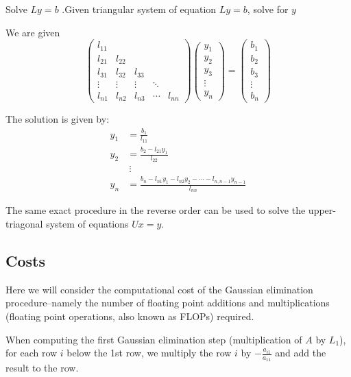 \documentclass[12pt,letterpaper]{article}
\begin{document}
\begin{algo}{Solve $Ly = b$}
.Given triangular system of equation $Ly = b$, solve for $y$

We are given
\begin{equation}
\begin{pmatrix}
	l_{11} & \\
	l_{21} & l_{22} \\
	l_{31} & l_{32} & l_{33} \\
	\vdots & \vdots & \vdots & \ddots \\
	l_{n1} & l_{n2} & l_{n3} & \cdots & l_{nn}
\end{pmatrix}
\begin{pmatrix}
	y_1 \\ y_2 \\ y_3 \\ \vdots \\ y_n
\end{pmatrix} =
\begin{pmatrix}
	b_1 \\ b_2 \\ b_3 \\ \vdots \\ b_n
\end{pmatrix}
\end{equation}

The solution is given by:
\begin{align}
	y_1 &= \frac{b_1}{l_{11}} \\
	y_2 &= \frac{b_2 - l_{21}y_1}{l_{22}}\\
	&\ \vdots \\
	y_n &= \frac{b_n - l_{n1}y_1 - l_{n2}y_2 - \cdots - l_{n,n-1}y_{n-1}}{l_{nn}}
\end{align}

The same exact procedure in the reverse order can be used to solve the upper-triagonal system of equations $Ux = y$.
\label{alg:triagonal}
\end{algo}

\subsection{Costs}
Here we will consider the computational cost of the Gaussian elimination procedure--namely the number of floating point additions and multiplications (floating point operations, also known as FLOPs) required.

When computing the first Gaussian elimination step (multiplication of $A$ by $L_1$), for each row $i$ below the 1st row, we multiply the row $i$ by $-\frac{a_{i1}}{a_{11}}$ and add the result to the row.
\end{document}
